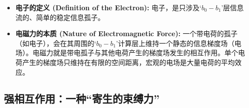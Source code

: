 \documentclass[12pt]{article}
\begin{document}
\begin{itemize}
    \item \textbf{电子的定义 (Definition of the Electron):} 电子，是只涉及`$b_0-b_1$'层信息流的、简单的稳定信息孤子。
    \item \textbf{电磁力的本质 (Nature of Electromagnetic Force):} 一个带电荷的孤子（如电子），会在其周围的`$b_0-b_1$'计算层上维持一个静态的信息梯度场（电场）。电磁力就是带电孤子与其他电荷产生的梯度场发生的相互作用。单个电荷产生的梯度场只维持在有限的空间距离，宏观的电场是大量电荷的平均效应。
\end{itemize}

\subsection{强相互作用：一种``寄生的束缚力''}
\end{document}
